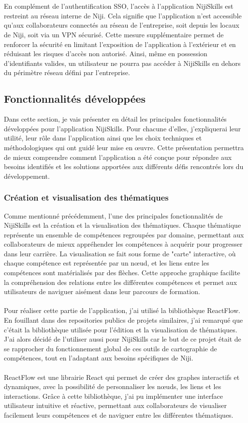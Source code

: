\documentclass[12pt]{article}
\begin{document}
\\\\
En complément de l’authentification SSO, l’accès à l’application NijiSkills est restreint au réseau interne de Niji. Cela signifie que l’application n’est accessible qu’aux collaborateurs connectés au réseau de l’entreprise, soit depuis les locaux de Niji, soit via un VPN sécurisé. Cette mesure supplémentaire permet de renforcer la sécurité en limitant l’exposition de l’application à l’extérieur et en réduisant les risques d’accès non autorisé. Ainsi, même en possession d’identifiants valides, un utilisateur ne pourra pas accéder à NijiSkills en dehors du périmètre réseau défini par l’entreprise.
\subsection{Fonctionnalités développées}
Dans cette section, je vais présenter en détail les principales fonctionnalités développées pour l’application NijiSkills. Pour chacune d’elles, j’expliquerai leur utilité, leur rôle dans l’application ainsi que les choix techniques et méthodologiques qui ont guidé leur mise en œuvre. Cette présentation permettra de mieux comprendre comment l’application a été conçue pour répondre aux besoins identifiés et les solutions apportées aux différents défis rencontrés lors du développement.
\subsubsection{Création et visualisation des thématiques}
Comme mentionné précédemment, l'une des principales fonctionnalités de NijiSkills est la création et la visualisation des thématiques. Chaque thématique représente un ensemble de compétences regroupées par domaine, permettant aux collaborateurs de mieux appréhender les compétences à acquérir pour progresser dans leur carrière. La visualisation se fait sous forme de "carte" interactive, où chaque compétence est représentée par un nœud, et les liens entre les compétences sont matérialisés par des flèches. Cette approche graphique facilite la compréhension des relations entre les différentes compétences et permet aux utilisateurs de naviguer aisément dans leur parcours de formation.
\\\\
Pour réaliser cette partie de l'application, j'ai utilisé la bibliothèque ReactFlow. En fouillant dans des repositories publics de projets similaires, j'ai remarqué que c'était la bibliothèque utilisée pour l'édition et la visualisation de thématiques. J'ai alors décidé de l'utiliser aussi pour NijiSkills car le but de ce projet était de se rapprocher du fonctionnement global de ces outils de cartographie de compétences, tout en l'adaptant aux besoins spécifiques de Niji.
\\\\
ReactFlow est une librairie React qui permet de créer des graphes interactifs et dynamiques, avec la possibilité de personnaliser les nœuds, les liens et les interactions. Grâce à cette bibliothèque, j'ai pu implémenter une interface utilisateur intuitive et réactive, permettant aux collaborateurs de visualiser facilement leurs compétences et de naviguer entre les différentes thématiques.
\end{document}
